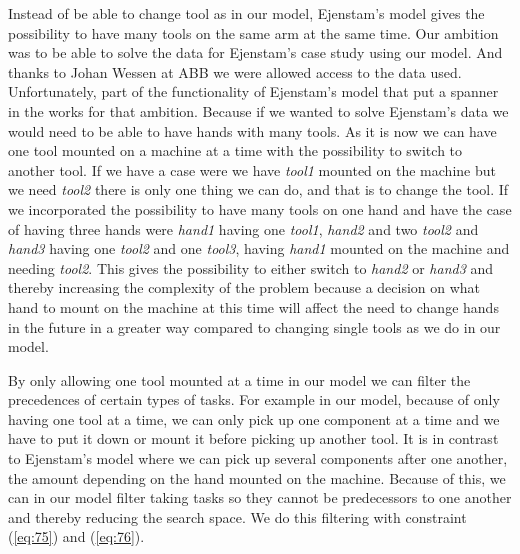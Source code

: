 Instead of be able to change tool as in our model, Ejenstam's model gives the possibility to have many tools on the same arm at the same time. Our ambition was to be able to solve the data for Ejenstam's case study using our model. And thanks to Johan Wessen at ABB we were allowed access to the data used. Unfortunately, part of the functionality of Ejenstam's model that put a spanner in the works for that ambition. Because if we wanted to solve Ejenstam's data we would need to be able to have hands with many tools. As it is now we can have one tool mounted on a machine at a time with the possibility to switch to another tool. If we have a case were we have \emph{tool1} mounted on the machine but we need \emph{tool2} there is only one thing we can do, and that is to change the tool. If we incorporated the possibility to have many tools on one hand and have the case of having three hands were \emph{hand1} having one \emph{tool1}, \emph{hand2} and two \emph{tool2} and \emph{hand3} having one \emph{tool2} and one \emph{tool3}, having \emph{hand1} mounted on the machine and needing \emph{tool2}. This gives the possibility to either switch to \emph{hand2} or \emph{hand3} and thereby increasing the complexity of the problem because a decision on what hand to mount on the machine at this time will affect the need to change hands in the future in a greater way compared to changing single tools as we do in our model.

By only allowing one tool mounted at a time in our model we can filter the precedences of certain types of tasks. For example in our model, because of only having one tool at a time, we can only pick up one component at a time and we have to put it down or mount it before picking up another tool. It is in contrast to Ejenstam's model where we can pick up several components after one another, the amount depending on the hand mounted on the machine. Because of this, we can in our model filter taking tasks so they cannot be predecessors to one another and thereby reducing the search space. We do this filtering with constraint (\ref{eq:75}) and (\ref{eq:76}).

